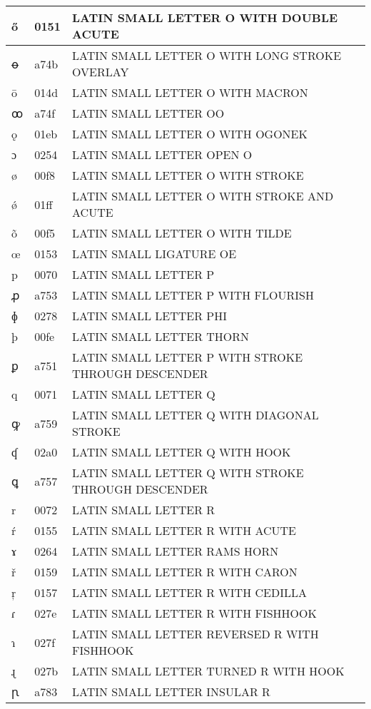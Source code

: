 \documentclass[12pt,letterpaper,openany]{book}
\begin{document}
\begin{center}
\begin{supertabular}{|m{0.25in}|m{0.5in}|m{4in}|}
ő & 0151 & LATIN SMALL LETTER O WITH DOUBLE ACUTE\\\hline
ꝋ & a74b & LATIN SMALL LETTER O WITH LONG STROKE OVERLAY\\\hline
ō & 014d & LATIN SMALL LETTER O WITH MACRON\\\hline
ꝏ & a74f & LATIN SMALL LETTER OO\\\hline
ǫ & 01eb & LATIN SMALL LETTER O WITH OGONEK\\\hline
ɔ & 0254 & LATIN SMALL LETTER OPEN O\\\hline
ø & 00f8 & LATIN SMALL LETTER O WITH STROKE\\\hline
ǿ & 01ff & LATIN SMALL LETTER O WITH STROKE AND ACUTE\\\hline
õ & 00f5 & LATIN SMALL LETTER O WITH TILDE\\\hline
œ & 0153 & LATIN SMALL LIGATURE OE\\\hline
p & 0070 & LATIN SMALL LETTER P\\\hline
ꝓ & a753 & LATIN SMALL LETTER P WITH FLOURISH\\\hline
ɸ & 0278 & LATIN SMALL LETTER PHI\\\hline
þ & 00fe & LATIN SMALL LETTER THORN\\\hline
ꝑ & a751 & \scriptsize LATIN SMALL LETTER P WITH STROKE THROUGH DESCENDER\\\hline
q & 0071 & LATIN SMALL LETTER Q\\\hline
ꝙ & a759 & LATIN SMALL LETTER Q WITH DIAGONAL STROKE\\\hline
ʠ & 02a0 & LATIN SMALL LETTER Q WITH HOOK\\\hline
ꝗ & a757 & \scriptsize LATIN SMALL LETTER Q WITH STROKE THROUGH DESCENDER\\\hline
r & 0072 & LATIN SMALL LETTER R\\\hline
ŕ & 0155 & LATIN SMALL LETTER R WITH ACUTE\\\hline
ɤ & 0264 & LATIN SMALL LETTER RAMS HORN\\\hline
ř & 0159 & LATIN SMALL LETTER R WITH CARON\\\hline
ŗ & 0157 & LATIN SMALL LETTER R WITH CEDILLA\\\hline
ɾ & 027e & LATIN SMALL LETTER R WITH FISHHOOK\\\hline
ɿ & 027f & LATIN SMALL LETTER REVERSED R WITH FISHHOOK\\\hline
ɻ & 027b & LATIN SMALL LETTER TURNED R WITH HOOK\\\hline
ꞃ & a783 & LATIN SMALL LETTER INSULAR R\\\hline

\end{supertabular}
\end{center}
\end{document}
